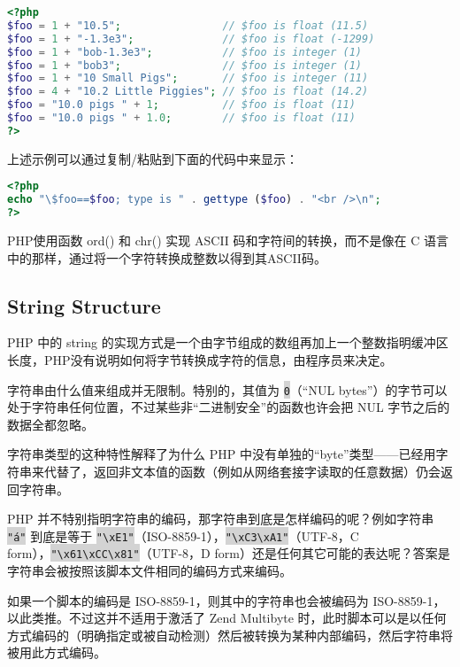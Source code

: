 \begin{lstlisting}[language=PHP]
<?php
$foo = 1 + "10.5";                // $foo is float (11.5)
$foo = 1 + "-1.3e3";              // $foo is float (-1299)
$foo = 1 + "bob-1.3e3";           // $foo is integer (1)
$foo = 1 + "bob3";                // $foo is integer (1)
$foo = 1 + "10 Small Pigs";       // $foo is integer (11)
$foo = 4 + "10.2 Little Piggies"; // $foo is float (14.2)
$foo = "10.0 pigs " + 1;          // $foo is float (11)
$foo = "10.0 pigs " + 1.0;        // $foo is float (11)     
?>
\end{lstlisting}

上述示例可以通过复制/粘贴到下面的代码中来显示：

\begin{lstlisting}[language=PHP]
<?php
echo "\$foo==$foo; type is " . gettype ($foo) . "<br />\n";
?>
\end{lstlisting}

PHP使用函数 ord() 和 chr() 实现 ASCII 码和字符间的转换，而不是像在 C 语言中的那样，通过将一个字符转换成整数以得到其ASCII码。


\subsection{String Structure}

PHP 中的 string 的实现方式是一个由字节组成的数组再加上一个整数指明缓冲区长度，PHP没有说明如何将字节转换成字符的信息，由程序员来决定。

字符串由什么值来组成并无限制。特别的，其值为 \colorbox{lightgray}{\texttt{0}}（“NUL bytes”）的字节可以处于字符串任何位置，不过某些非“二进制安全”的函数也许会把 NUL 字节之后的数据全都忽略。

字符串类型的这种特性解释了为什么 PHP 中没有单独的“byte”类型——已经用字符串来代替了，返回非文本值的函数（例如从网络套接字读取的任意数据）仍会返回字符串。

PHP 并不特别指明字符串的编码，那字符串到底是怎样编码的呢？例如字符串 \colorbox{lightgray}{\texttt{"á"}} 到底是等于 \colorbox{lightgray}{\texttt{"\textbackslash xE1"}}（ISO-8859-1），\colorbox{lightgray}{\texttt{"\textbackslash xC3\textbackslash xA1"}}（UTF-8，C form），\colorbox{lightgray}{\texttt{"\textbackslash x61\textbackslash xCC\textbackslash x81"}}（UTF-8，D form）还是任何其它可能的表达呢？答案是字符串会被按照该脚本文件相同的编码方式来编码。

如果一个脚本的编码是 ISO-8859-1，则其中的字符串也会被编码为 ISO-8859-1，以此类推。不过这并不适用于激活了 Zend Multibyte 时，此时脚本可以是以任何方式编码的（明确指定或被自动检测）然后被转换为某种内部编码，然后字符串将被用此方式编码。

